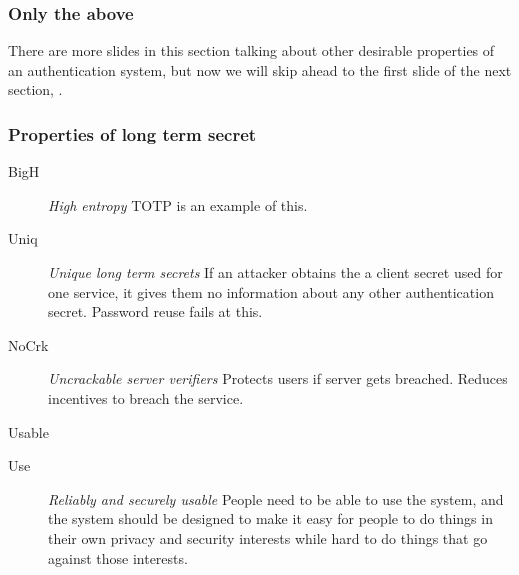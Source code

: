 \documentclass[xcolor={dvipsnames,table,hyperref}]{beamer}
\newcommand{\propdescription}[1]{\textit{#1}\hspace*{\fill}\linebreak }
\begin{document}
\begin{frame}
  \frametitle{Only the above}
  There are more slides in this section talking about other desirable properties of an authentication system, but now we will skip ahead to the first slide of the next section,
  .
\end{frame}

\begin{frame}
  \frametitle{Properties of long term secret}
  \begin{description}
    \item[BigH] \propdescription{High entropy}
      TOTP is an example of this.
    \item[Uniq] \propdescription{Unique long term secrets}
      If an attacker obtains the a client secret used for one service,
      it gives them no information about any other authentication secret.
      Password reuse fails at this.
    \item[NoCrk] \propdescription{Uncrackable server verifiers}
      Protects users if server gets breached. Reduces incentives to breach the service.
  \end{description}
\end{frame}

\begin{frame}{Usable}
  \begin{description}
    \item[Use] \propdescription{Reliably and securely usable}
      People need to be able to use the system, and the system should be designed to make it easy for people to do things in their own privacy and security interests while hard to do things that go against those interests.
  \end{description}

\end{frame}
\end{document}
